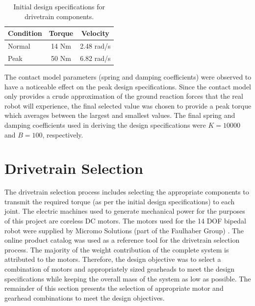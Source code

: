 \begin{table}[!h]
  \centering
  \caption{Initial design specifications for drivetrain components.}
    \begin{tabular}{lcc}
    \addlinespace
    \toprule
    \textbf{Condition} & \textbf{Torque} & \textbf{Velocity}\\
    \midrule
    Normal & 14 Nm & 2.48 rad/s\\
    Peak  & 50 Nm & 6.82 rad/s \\
    \bottomrule
    \end{tabular}%
  \label{tab:spectable}%
\end{table}%

The contact model parameters (spring and damping coefficients) were observed to have a noticeable effect on the peak design specifications. Since the contact model only provides a crude approximation of the ground reaction forces that the real robot will experience, the final selected value was chosen to provide a peak torque which averages between the largest and smallest values. The final spring and damping coefficients used in deriving the design specifications were $K = 10000$ and $B = 100$, respectively.




\section{Drivetrain Selection} %
\label{sec:drivetrain}
The drivetrain selection process includes selecting the appropriate components to transmit the required torque (as per the initial design specifications) to each joint. The electric machines used to generate mechanical power for the purposes of this project are coreless DC motors. The motors used for the 14 DOF bipedal robot were supplied by Micromo Solutions (part of the Faulhaber Group) \cite{sw:micromo}. The online product catalog was used as a reference tool for the drivetrain selection process. The majority of the weight contribution of the complete system is attributed to the motors. Therefore, the design objective was to select a combination of motors and appropriately sized gearheads to meet the design specifications while keeping the overall mass of the system as low as possible. The remainder of this section presents the selection of appropriate motor and gearhead combinations to meet the design objectives. 


